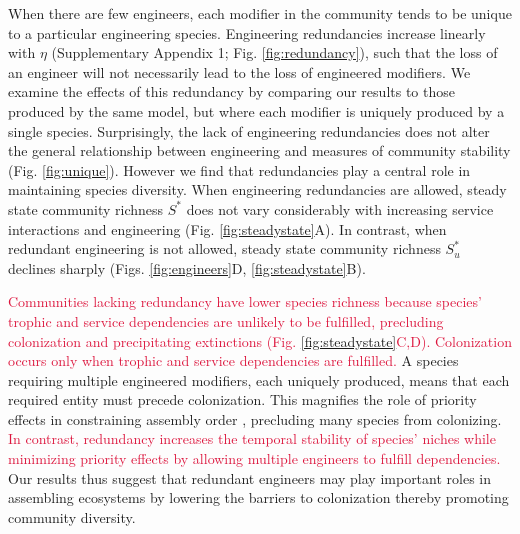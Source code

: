 \documentclass[twocolumn,preprintnumbers,amsmath,amssymb,superscriptaddress,linenumbers]{revtex4-1}
\newcommand{\rev}[1]{\textcolor{crimson}{#1}}
\begin{document}
When there are few engineers, each modifier in the community tends to be unique to a particular engineering species.
Engineering redundancies increase linearly with $\eta$ (Supplementary Appendix 1; Fig. \ref{fig:redundancy}), such that the loss of an engineer will not necessarily lead to the loss of engineered modifiers. %
We examine the effects of this redundancy by comparing our results to those produced by the same model, but where each modifier is uniquely produced by a single species.
Surprisingly, the lack of engineering redundancies does not alter the general relationship between engineering and measures of community stability (Fig. \ref{fig:unique}).
However we find that redundancies play a central role in maintaining species diversity.
When engineering redundancies are allowed, steady state community richness $S^*$ does not vary considerably with increasing service interactions and engineering (Fig. \ref{fig:steadystate}A).
In contrast, when redundant engineering is not allowed, steady state community richness $S^*_u$ declines sharply (Figs. \ref{fig:engineers}D, \ref{fig:steadystate}B).

\rev{Communities lacking redundancy have lower species richness because species' trophic and service dependencies are unlikely to be fulfilled, precluding colonization and precipitating extinctions (Fig. \ref{fig:steadystate}C,D).
Colonization occurs only when trophic and service dependencies are fulfilled.}
A species requiring multiple engineered modifiers, each uniquely produced, means that each required entity must precede colonization.
This magnifies the role of priority effects in constraining assembly order \cite{Fukami2015}, precluding many species from colonizing.
\rev{In contrast, redundancy increases the temporal stability of species' niches while minimizing priority effects by allowing multiple engineers to fulfill dependencies.}
Our results thus suggest that redundant engineers may play important roles in assembling ecosystems by lowering the barriers to colonization thereby promoting community diversity.
\end{document}
